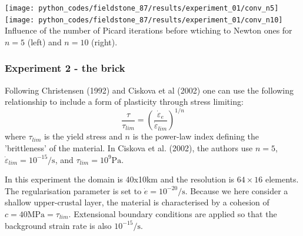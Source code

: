\begin{center}
\texttt{[image: python\_codes/fieldstone\_87/results/experiment\_01/conv\_n5]}
\texttt{[image: python\_codes/fieldstone\_87/results/experiment\_01/conv\_n10]}\\
{\captionfont Influence of the number of Picard iterations before wtiching to Newton ones
for $n=5$ (left) and $n=10$ (right).}
\end{center}



\newpage
\subsubsection*{Experiment 2 - the brick }

Following Christensen (1992) \cite{chri92} and Ciskova et al (2002) \cite{civv02} 
one can use the following relationship to include a form of plasticity through stress limiting:
\[
\frac{\tau}{\tau_{lim}} = \left( \frac{ \dot{\varepsilon}_e  }{ \dot{\varepsilon}_{lim}  }  \right)^{1/n}
\]
where $\tau_{lim}$ is the yield stress and $n$ is the power-law index defining the 'brittleness'
of the material. In Ciskova et al. (2002), 
the authors use $n=5$, $\dot{\varepsilon}_{lim}=10^{-15}\si{\per\second}$, 
and $\tau_{lim}=10^{9}\si{\pascal}$. 

In this experiment the domain is 40x10\si{\kilo\metre} and the resolution is $64\times 16$ elements. 
The regularisation parameter is set to $\dot{e}=10^{-20}\si{\per\second}$.
Because we here consider a shallow upper-crustal 
layer, the material is characterised by a cohesion of $c=40\si{\mega\pascal}=\tau_{lim}$.
Extensional boundary conditions are applied so that the background strain rate is 
also $10^{-15}\si{\per\second}$.


